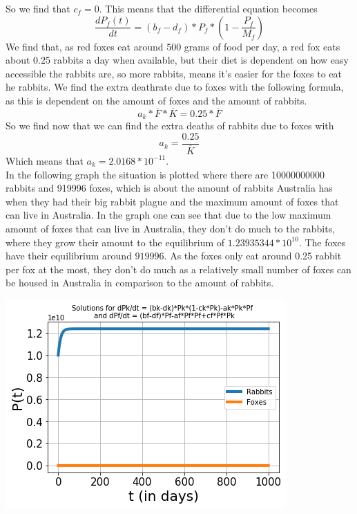 \documentclass{article}
\begin{document}
So we find that $c_f=0$. This means that the differential equation becomes 
$$\frac{dP_f(t)}{dt}=(b_f-d_f)*P_f*(1-\frac{P_f}{M_f})$$
We find that, as red foxes eat around 500 grams of food per day, a red fox eats about 0.25 rabbits a day when available, but their diet is dependent on how easy accessible the rabbits are, so more rabbits, means it's easier for the foxes to eat he rabbits. We find the extra deathrate due to foxes with the following formula, as this is dependent on the amount of foxes and the amount of rabbits.
$$a_k*\overline{F}*\overline{K}=0.25*\overline{F}$$
So we find now that we can find the extra deaths of rabbits due to foxes with
$$a_k=\frac{0.25}{\overline{K}}$$
Which means that $a_k=2.0168*10^{-11}$.
\\In the following graph the situation is plotted where there are 10000000000 rabbits and 919996 foxes, which is about the amount of rabbits Australia has when they had their big rabbit plague and the maximum amount of foxes that can live in Australia. In the graph one can see that due to the low maximum amount of foxes that can live in Australia, they don't do much to the rabbits, where they grow their amount to the equilibrium of $1.23935344*10^10$. The foxes have their equilibrium around $919996$. As the foxes only eat around 0.25 rabbit per fox at the most, they don't do much as a relatively small number of foxes can be housed in Australia in comparison to the amount of rabbits. 
\begin{center}
    \includegraphics[scale=0.78]{Pictures/RabbitFoxes.png}
\end{center}


\end{document}
